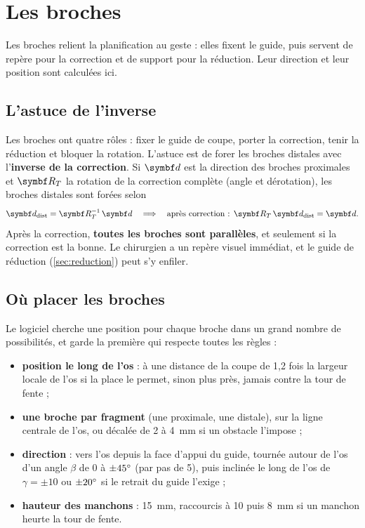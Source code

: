 \section{Les broches}
\label{sec:broches}

Les broches relient la planification au geste : elles fixent le guide, puis servent de repère pour la correction et
de support pour la réduction. Leur direction et leur position sont calculées ici.

\subsection{L'astuce de l'inverse}

Les broches ont quatre rôles : fixer le guide de coupe, porter la correction, tenir la réduction et bloquer la
rotation. L'astuce est de forer les broches distales avec l'\textbf{inverse de la correction}. Si $\vb{d}$ est la
direction des broches proximales et $\mt{R}_T$ la rotation de la correction complète (angle et dérotation), les
broches distales sont forées selon
\begin{equation}
  \vb{d}_{\text{dist}} = \mt{R}_T^{-1}\,\vb{d}
  \quad\Longrightarrow\quad
  \text{après correction : } \mt{R}_T\,\vb{d}_{\text{dist}} = \vb{d}.
\end{equation}
Après la correction, \textbf{toutes les broches sont parallèles}, et seulement si la correction est la bonne. Le
chirurgien a un repère visuel immédiat, et le guide de réduction (\cref{sec:reduction}) peut s'y enfiler.


\subsection{Où placer les broches}

Le logiciel cherche une position pour chaque broche dans un grand nombre de possibilités, et garde la première qui
respecte toutes les règles :
\begin{itemize}
  \item \textbf{position le long de l'os} : à une distance de la coupe de 1,2 fois la largeur locale de l'os si la
  place le permet, sinon plus près, jamais contre la tour de fente ;
  \item \textbf{une broche par fragment} (une proximale, une distale), sur la ligne centrale de l'os, ou décalée de 2 à
  4~mm si un obstacle l'impose ;
  \item \textbf{direction} : vers l'os depuis la face d'appui du guide, tournée autour de l'os d'un angle $\beta$ de
  0 à $\pm 45^\circ$ (par pas de 5\degre), puis inclinée le long de l'os de $\gamma = \pm 10$ ou $\pm 20^\circ$ si le
  retrait du guide l'exige ;
  \item \textbf{hauteur des manchons} : 15~mm, raccourcis à 10 puis 8~mm si un manchon heurte la tour de fente.
\end{itemize}

